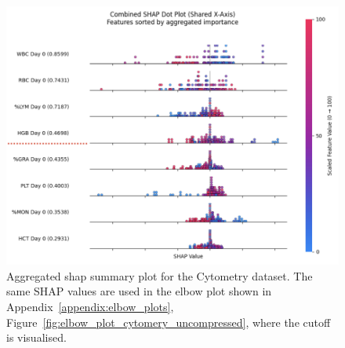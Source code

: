 \documentclass[12pt,a4paper]{report}
\begin{document}
\begin{figure}[h!]
    \centering
    \includegraphics[width=0.9\linewidth]{images/Aggregated_SHAP_cytometry_uncompressed.png}
    \caption[Aggregated SHAP plot for Cytometry]{Aggregated \gls{shap} summary plot for the Cytometry dataset. The same SHAP values are used in the elbow plot shown in Appendix~\ref{appendix:elbow_plots}, Figure~\ref{fig:elbow_plot_cytomery_uncompressed}, where the cutoff is visualised.}
    \label{fig:cytometry_aggregated_shap} 
\end{figure}
\end{document}
